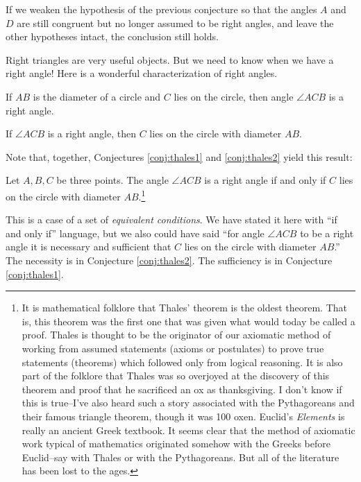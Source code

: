 \begin{conjecture}
\label{conj:ASS}
If we weaken the hypothesis of the previous conjecture so that the angles $A$ and $D$ are still congruent but no longer assumed to be right angles, and leave the other hypotheses intact, the conclusion still holds.
\end{conjecture}

Right triangles are very useful objects. 
But we need to know when we have a right angle! 
Here is a wonderful characterization of right angles.

\begin{conjecture}
\label{conj:thales1}
If $AB$ is the diameter of a circle and $C$ lies on the circle, then angle $\angle ACB$ is a right angle.
\end{conjecture}

\begin{conjecture}
\label{conj:thales2}
If $\angle ACB$ is a right angle, then $C$ lies on the circle with diameter $AB$.
\end{conjecture}

Note that, together, Conjectures \ref{conj:thales1} and \ref{conj:thales2} yield this result:
\begin{unthm} 
Let $A, B, C$ be three points. 
The angle $\angle ACB$ is a right angle if and only if $C$ lies on the circle with diameter $AB$.\footnote{It is mathematical folklore that Thales' theorem is the oldest theorem. 
That is, this theorem was the first one that was given what would today be called a proof. 
Thales is thought to be the originator of our axiomatic method of working from assumed statements (axioms or postulates) to prove true statements (theorems) which followed only from logical reasoning. 
It is also part of the folklore that Thales was so overjoyed at the discovery of this theorem and proof that he sacrificed an ox as thanksgiving. 
I don't know if this is true--I've also heard such a story associated with the Pythagoreans and their famous triangle theorem, though it was 100 oxen. 
Euclid's \emph{Elements} is really an ancient Greek textbook. 
It seems clear that the method of axiomatic work typical of mathematics originated somehow with the Greeks before Euclid--say with Thales or with the Pythagoreans. But all of the literature has been lost to the ages.}
\end{unthm}



This is a case of a set of \emph{equivalent conditions}. We have stated it
here with ``if and only if'' language, but we also could have said ``for angle $\angle ACB$ to be a right angle it is necessary and sufficient that $C$ lies on the circle with diameter $AB$.'' The necessity is in Conjecture \ref{conj:thales2}. The sufficiency is in Conjecture \ref{conj:thales1}.



